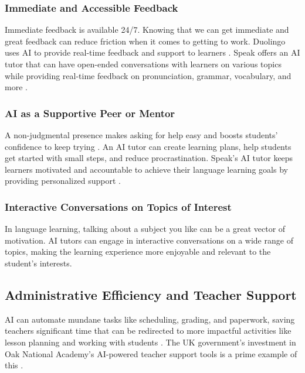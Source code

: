 \documentclass{article}
\begin{document}
\subsubsection{Immediate and Accessible Feedback}

Immediate feedback is available 24/7. Knowing that we can get immediate and great feedback can reduce friction when it comes to getting to work. Duolingo uses AI to provide real-time feedback and support to learners \cite{https://www.forbes.com/sites/bernardmarr/2023/04/28/the-amazing-ways-duolingo-is-using-ai-and-gpt-4/?sh=6f4d48181346}. Speak offers an AI tutor that can have open-ended conversations with learners on various topics while providing real-time feedback on pronunciation, grammar, vocabulary, and more \cite{https://www.speak.com/}.

\subsubsection{AI as a Supportive Peer or Mentor}

A non-judgmental presence makes asking for help easy and boosts students' confidence to keep trying \cite{https://link.springer.com/article/10.1007/s10639-022-11177-3}. An AI tutor can create learning plans, help students get started with small steps, and reduce procrastination. Speak's AI tutor keeps learners motivated and accountable to achieve their language learning goals by providing personalized support \cite{https://www.speak.com/}.

\subsubsection{Interactive Conversations on Topics of Interest}

In language learning, talking about a subject you like can be a great vector of motivation. AI tutors can engage in interactive conversations on a wide range of topics, making the learning experience more enjoyable and relevant to the student's interests.

\subsection{Administrative Efficiency and Teacher Support}

AI can automate mundane tasks like scheduling, grading, and paperwork, saving teachers significant time that can be redirected to more impactful activities like lesson planning and working with students \cite{https://www.datasciencecentral.com/automated-grading-systems-how-ai-is-revolutionizing-exam-evaluation/} \cite{https://www.mckinsey.com/industries/education/our-insights/how-artificial-intelligence-will-impact-k-12-teachers}. The UK government's investment in Oak National Academy's AI-powered teacher support tools is a prime example of this \cite{govuk_ai_teacher_support} \cite{openaccessgov_ai_teacher_support}.
\end{document}
